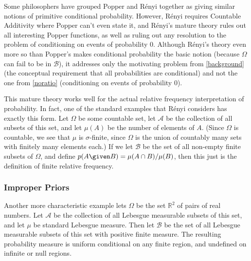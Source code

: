 Some philosophers have grouped Popper and R\'{e}nyi together as giving similar notions of primitive conditional probability. However, R\'{e}nyi requires Countable Additivity where Popper can't even state it, and R\'{e}nyi's mature theory rules out all interesting Popper functions, as well as ruling out any resolution to the problem of conditioning on events of  probability $0$. Although R\'{e}nyi's theory even more so than Popper's makes conditional probability the basic notion (because $\Omega$ can fail to be in $\mathcal{B}$), it addresses only the motivating problem from \autoref{background} (the conceptual requirement that all probabilities are conditional) and not the one from \autoref{noratio} (conditioning on events of probability $0$).

This mature theory works well for the actual relative frequency interpretation of probability. In fact, one of the standard examples that R\'{e}nyi considers has exactly this form. Let $\Omega$ be some countable set, let $\mathcal{A}$ be the collection of all subsets of this set, and let $\mu(A)$ be the number of elements of $A$. (Since $\Omega$ is countable, we see that $\mu$ is $\sigma$-finite, since $\Omega$ is the union of countably many sets with finitely many elements each.) If we let $\mathcal{B}$ be the set of all non-empty finite subsets of $\Omega$, and define $p(A \given B)=\mu(A\cap B)/\mu(B)$, then this just is the definition of finite relative frequency.

\subsubsection{Improper Priors}\label{improper}

Another more characteristic example lets $\Omega$ be the set $\mathbb{R}^2$ of pairs of real numbers. Let $\mathcal{A}$ be the collection of all Lebesgue measurable subsets of this set, and let $\mu$ be standard Lebesgue measure. Then let $\mathcal{B}$ be the set of all Lebesgue measurable subsets of this set with positive finite measure. The resulting probability measure is uniform conditional on any finite region, and undefined on infinite or null regions.

